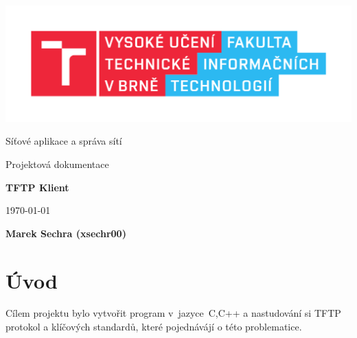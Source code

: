 \documentclass[a4paper, 11pt]{article}
\begin{document}
	\begin{titlepage}
		\begin{center}
			\includegraphics[width=0.77\linewidth]{img/FIT_logo.pdf} \\


			\Huge{Síťové aplikace a správa sítí} \\
			\bigskip
			
			\Huge{Projektová dokumentace}\\
			\bigskip
			
			\huge{\textbf{	TFTP Klient}} \\

		\end{center}

		\begin{minipage}{0.3 \textwidth}
			{\Large \today}
		\end{minipage}
		\hfill
		\begin{minipage}[r]{0.40 \textwidth}
			\Large
				\textbf{Marek Sechra  (xsechr00)}
		\end{minipage}
	\end{titlepage}



    \tableofcontents
	\clearpage



	\setcounter{page}{1}
	
	\section{Úvod}

	Cílem projektu bylo vytvořit program v~jazyce~C,C++ a nastudování si TFTP protokol a klíčových standardů, které pojednávájí o této problematice.
 


	
	
\end{document}
